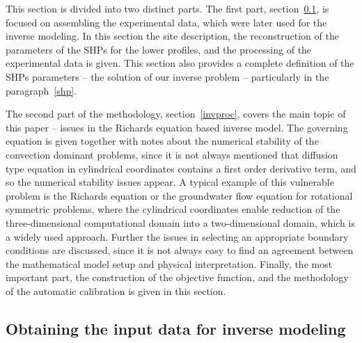 \documentclass[review]{elsarticle}
\begin{document}
This section is divided into two distinct parts. The first part, section~\ref{assamb}, is focused on assembling the experimental data, which were later used for the inverse modeling. In this section the site description, the reconstruction of the parameters of the SHPs for the lower profiles, and the processing of the experimental data is given.   This section also provides a complete definition of the SHPs parameters -- the solution of our inverse problem -- particularly in the paragraph~\ref{shp}.

The second part of the methodology, section~\ref{invproc}, covers the main topic of this paper --  issues in the Richards equation based inverse model. The governing equation is given together with  notes about the numerical stability of the convection dominant problems, since it is not always mentioned that diffusion type equation in cylindrical coordinates  contains a first order derivative term,  and so the numerical stability issues appear. A typical example of this vulnerable problem is the Richards equation or the groundwater flow equation for rotational symmetric problems, where the cylindrical coordinates enable reduction of the three-dimensional computational domain into a two-dimensional domain, which is a widely used approach.
Further the issues in selecting an appropriate boundary conditions are discussed, since it is not always easy to find an agreement between the mathematical model setup and  physical interpretation. Finally, the most important part, the construction of the objective function, and the methodology of the automatic calibration is given in this section. 



\subsection{Obtaining the input data for inverse modeling}
\label{assamb}
\end{document}
